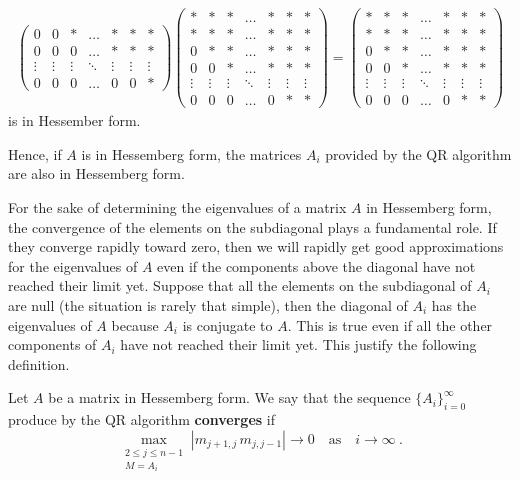 \begin{rmk}
\begin{align*}
\begin{pmatrix}
0 & 0 & * & \ldots & * & * & * \\
0 & 0 & 0 & \ldots & * & * & * \\
\vdots & \vdots & \vdots & \ddots & \vdots & \vdots & \vdots \\
0 & 0 & 0 & \ldots & 0 & 0 & *
\end{pmatrix}
\begin{pmatrix}
* & * & * & \ldots & * & * & * \\
* & * & * & \ldots & * & * & * \\
0 & * & * & \ldots & * & * & * \\
0 & 0 & * & \ldots & * & * & * \\
\vdots & \vdots & \vdots & \ddots & \vdots & \vdots & \vdots \\
0 & 0 & 0 & \ldots & 0 & * & *
\end{pmatrix}
=
\begin{pmatrix}
* & * & * & \ldots & * & * & * \\
* & * & * & \ldots & * & * & * \\
0 & * & * & \ldots & * & * & * \\
0 & 0 & * & \ldots & * & * & * \\
\vdots & \vdots & \vdots & \ddots & \vdots & \vdots & \vdots \\
0 & 0 & 0 & \ldots & 0 & * & *
\end{pmatrix}
\end{align*}
is in Hessember form.

Hence, if $A$ is in Hessemberg form, the matrices $A_i$ provided by the QR
algorithm are also in Hessemberg form.
\label{C14L33}
\end{rmk}

For the sake of determining the eigenvalues of a matrix $A$ in
Hessemberg form, the convergence of the elements on the subdiagonal
plays a fundamental role.  If they converge rapidly toward zero, then
we will rapidly get good approximations for the eigenvalues of $A$
even if the components above the diagonal have not reached their limit
yet.  Suppose that all the elements on the subdiagonal of $A_i$ are
null (the situation is rarely that simple), then the diagonal of $A_i$
has the eigenvalues of $A$ because $A_i$ is conjugate to $A$.  This is
true even if all the other components of $A_i$ have not reached their
limit yet.  This justify the following definition.

\begin{defn}
Let $A$ be a matrix in Hessemberg form.  We say that the sequence
$\displaystyle \{ A_i\}_{i=0}^\infty$ produce by the QR algorithm
{\bfseries converges} if
\[
  \max_{\substack{2\leq j \leq n-1\\ M = A_i}} |m_{j+1,j}\,m_{j,j-1}| \rightarrow 0
\quad \text{as} \quad  i\rightarrow \infty \ .
\]
\end{defn}

